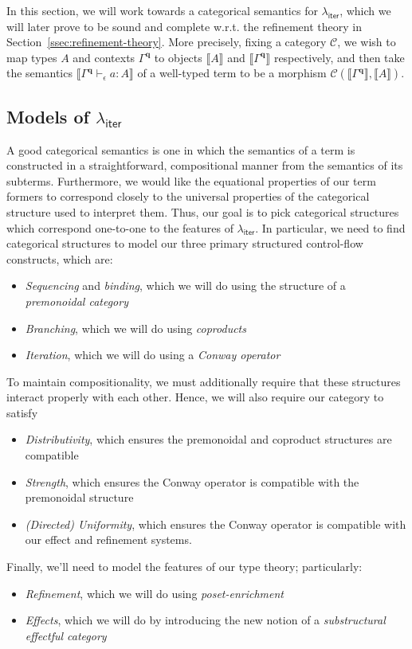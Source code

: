 \documentclass[acmsmall,screen,review]{acmart}
\newcommand{\mc}[1]{\ensuremath{\mathcal{#1}}}
\newcommand{\mb}[1]{\ensuremath{\mathbf{#1}}}
\newcommand{\ms}[1]{\ensuremath{\mathsf{#1}}}
\newcommand{\hasty}[4]{#1 \vdash_{#2} #3: {#4}}
\newcommand{\dnt}[1]{\llbracket{#1}\rrbracket}
\newcommand{\subiterexp}{\texorpdfstring{\(\lambda_{\ms{iter}}\)}{lambda-iter}}
\begin{document}
In this section, we will work towards a categorical semantics for \subiterexp{}, which we will later
prove to be sound and complete w.r.t. the refinement theory in Section~\ref{ssec:refinement-theory}.
More precisely, fixing a category $\mc{C}$, we wish to map types $A$ and contexts $\Gamma^{\mb{q}}$
to objects $\dnt{A}$ and $\dnt{\Gamma^{\mb{q}}}$ respectively, and then take the semantics
$\dnt{\hasty{\Gamma^{\mb{q}}}{\epsilon}{a}{A}}$ of a well-typed term to be a morphism
$\mc{C}(\dnt{\Gamma^{\mb{q}}}, \dnt{A})$.

\subsection{Models of \subiterexp{}}

A good categorical semantics is one in which the semantics of a term is constructed in a
straightforward, compositional manner from the semantics of its subterms. Furthermore, we would like
the equational properties of our term formers to correspond closely to the universal properties of
the categorical structure used to interpret them. Thus, our goal is to pick categorical structures
which correspond  one-to-one to the features of \subiterexp{}. In
particular, we need to find categorical structures to model our three primary structured
control-flow constructs, which are:
\begin{itemize}
  \item \emph{Sequencing} and \emph{binding}, which we will do using the structure of a
  \emph{premonoidal category}
  \item \emph{Branching}, which we will do using \emph{coproducts}
  \item \emph{Iteration}, which we will do using a \emph{Conway operator}
\end{itemize}
To maintain compositionality, we must additionally require that these structures interact properly 
with each other. Hence, we will also require our category to satisfy
\begin{itemize}
  \item \emph{Distributivity}, which ensures the premonoidal and coproduct structures are compatible
  \item \emph{Strength}, which ensures the Conway operator is compatible with the premonoidal
  structure
  \item \emph{(Directed) Uniformity}, which ensures the Conway operator is compatible with our
  effect and refinement systems.
\end{itemize}
Finally, we'll need to model the features of our type theory; particularly:
\begin{itemize}
  \item \emph{Refinement}, which we will do using \emph{poset-enrichment}
  \item \emph{Effects}, which we will do by introducing the new notion of a \emph{substructural
  effectful category}
\end{itemize}
\end{document}
